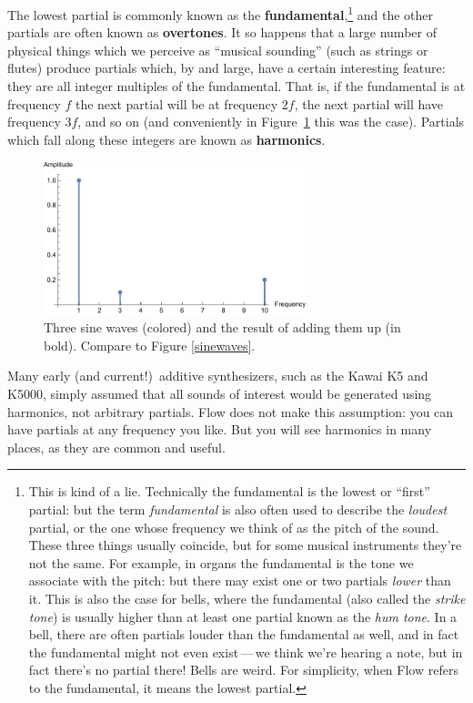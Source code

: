 \documentclass{article}
\newcommand\name{Flow}
\begin{document}
The lowest partial is commonly known as the {\bf fundamental},\footnote{This is kind of a lie.  Technically the fundamental is the lowest or ``first'' partial: but the term {\it fundamental} is also often used to describe the {\it loudest} partial, or the one whose frequency we think of as the pitch of the sound.  These three things usually coincide, but for some musical instruments they're not the same.  For example, in organs the fundamental is the tone we associate with the pitch: but there may exist one or two partials {\it lower} than it.  This is also the case for bells, where the fundamental (also called the {\it strike tone}) is usually higher than at least one partial known as the {\it hum tone}.  In a bell, there are often partials louder than the fundamental as well, and in fact the fundamental might not even exist\,---\,we think we're hearing a note, but in fact there's no partial there!  Bells are weird.   For simplicity, when {\name} refers to the fundamental, it means the lowest partial.}  and the other partials are often known as {\bf overtones}.  It so happens that a large number of physical things which we perceive as ``musical sounding'' (such as strings or flutes) produce partials which, by and large, have a certain interesting feature: they are all integer multiples of the fundamental.  That is, if the fundamental is at frequency \(f\) the next partial will be at frequency \(2f\), the next partial will have frequency \(3f\), and so on (and conveniently in Figure~\ref{partials} this was the case).  Partials which fall along these integers are known as {\bf harmonics}.  

\begin{figure}
\includegraphics[width=3in]{partials}
\caption{Three sine waves (colored) and the result of adding them up (in bold).  Compare to Figure \ref{sinewaves}.}
\label{partials}
\end{figure}

Many early (and current!)\ additive synthesizers, such as the Kawai K5 and K5000, simply assumed that all sounds of interest would be generated using harmonics, not arbitrary partials.   {\name} does not make this assumption: you can have partials at any frequency you like.  But you will see harmonics in many places, as they are common and useful.
\end{document}

